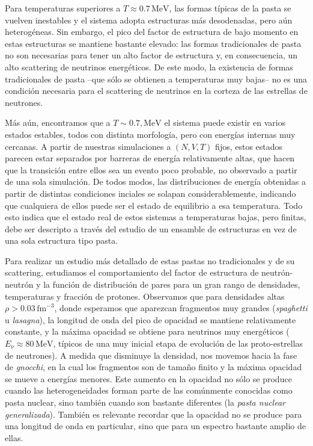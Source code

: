 Para temperaturas superiores a $T\approx0.7\,\text{MeV}$, las formas típicas de la pasta se vuelven inestables y el sistema adopta estructuras más desodenadas, pero aún heterogéneas.
Sin embargo, el pico del factor de estructura de bajo momento en estas estructuras se mantiene bastante elevado: las formas tradicionales de pasta no son necesarias para tener un alto factor de estructura y, en consecuencia, un alto scattering de neutrinos energéticos.
De este modo, la existencia de formas tradicionales de pasta --que sólo se obtienen a temperaturas muy bajas-- no es una condición necesaria para el scattering de neutrinos en la corteza de las estrellas de neutrones.

Más aún, encontramos que a $T\sim0.7,\text{MeV}$ el sistema puede existir en varios estados estables, todos con distinta morfología, pero con energías internas muy cercanas.
A partir de nuestras simulaciones a $(N,V,T)$ fijos, estos estados parecen estar separados por barreras de energía relativamente altas, que hacen que la transición entre ellos sea un evento poco probable, no observado a partir de una sola simulación.
De todos modos, las distribuciones de energía obtenidas a partir de distintas condiciones inciales se solapan considerablemente, indicando que cualquiera de ellos puede ser el estado de equilibrio a esa temperatura.
Todo esto indica que el estado real de estos sistemas a temperaturas bajas, pero finitas, debe ser descripto a través del estudio de un ensamble de estructuras en vez de una sola estructura tipo pasta.


Para realizar un estudio más detallado de estas pastas no tradicionales y de su scattering, estudiamos el comportamiento del factor de estructura de neutrón-neutrón y la función de distribución de pares para un gran rango de densidades, temperaturas y fracción de protones.
Observamos que para densidades altas $\rho>0.03\,\text{fm}^{-3}$, donde esperamos que aparezcan fragmentos muy grandes (\emph{spaghetti} u \emph{lasagna}), la longitud de onda del pico de opacidad se mantiene relativamente constante, y la máxima opacidad se obtiene para neutrinos muy energéticos ($E_\nu \approx 80\,\text{MeV}$, típicos de una muy inicial etapa de evolución de las proto-estrellas de neutrones).
A medida que disminuye la densidad, nos movemos hacia la fase de \emph{gnocchi}, en la cual los fragmentos son de tamaño finito y la máxima opacidad se mueve a energías menores.
Este aumento en la opacidad no sólo se produce cuando las heterogeneidades forman parte de las comúnmente conocidas como pasta nuclear, sino también cuando son bastante diferentes (la \emph{pasta nuclear generalizada}).
También es relevante recordar que la opacidad no se produce para una longitud de onda en particular, sino que para un espectro bastante amplio de ellas.

